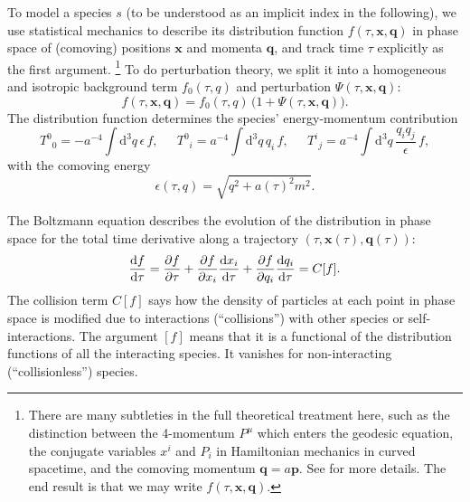 \documentclass[USenglish, thumbmarks]{uiophdthesis} %
\newcommand\diff{\mathrm{d}}
\begin{document}
To model a species $s$ (to be understood as an implicit index in the following),
we use statistical mechanics to describe its distribution function $f(\tau, \mathbf{x}, \mathbf{q})$ in phase space of (comoving) positions $\mathbf{x}$ and momenta $\mathbf{q}$,
and track time $\tau$ explicitly as the first argument.%
\footnote{There are many subtleties in the full theoretical treatment here,
such as the distinction between the 4-momentum $P^\mu$ which enters the geodesic equation,
the conjugate variables $x^i$ and $P_i$ in Hamiltonian mechanics in curved spacetime,
and the comoving momentum $\mathbf{q} = a \mathbf{p}$.
See \cite[section 5.1]{maCosmologicalPerturbationTheory1995a} for more details.
The end result is that we may write $f(\tau, \mathbf{x}, \mathbf{q})$.
}
To do perturbation theory,
we split it into a homogeneous and isotropic background term $f_0(\tau, q)$ and perturbation $\Psi(\tau, \mathbf{x}, \mathbf{q})$:
\begin{equation}
f(\tau, \mathbf{x}, \mathbf{q}) = f_0(\tau, q) \, \big(1 + \Psi(\tau, \mathbf{x}, \mathbf{q})\big)
.
\label{eq:distribution}
\end{equation}
The distribution function determines the species' energy-momentum contribution
\begin{equation}
T^0{}_0 = -a^{-4} \int \diff^3{q} \, \epsilon \, f , \ \ \quad
T^0{}_i = a^{-4} \int \diff^3{q} \, q_i \, f , \ \ \quad
T^i{}_j = a^{-4} \int \diff^3{q} \, \frac{q_i q_j}{\epsilon} \, f ,
\label{eq:Tgeneral}
\end{equation}
with the comoving energy
\begin{equation}
\epsilon(\tau, q) = \sqrt{q^2 + a(\tau)^2 m^2} .
\label{eq:comoving_energy}
\end{equation}

The Boltzmann equation describes the evolution of the distribution in phase space
for the total time derivative along a trajectory $(\tau, \mathbf{x}(\tau), \mathbf{q}(\tau))$:
\begin{equation}
\odv{f}{\tau} = \pdv{f}{\tau} + \pdv{f}{x_i} \odv{x_i}{\tau} + \pdv{f}{q_i} \odv{q_i}{\tau} = C[f] .
\label{eq:boltzmann}
\end{equation}
The collision term $C[f]$ says how the density of particles at each point in phase space
is modified due to interactions (\enquote{collisions}) with other species or self-interactions.
The argument $[f]$ means that it is a functional of the distribution functions of all the interacting species.
It vanishes for non-interacting (\enquote{collisionless}) species.
\end{document}
